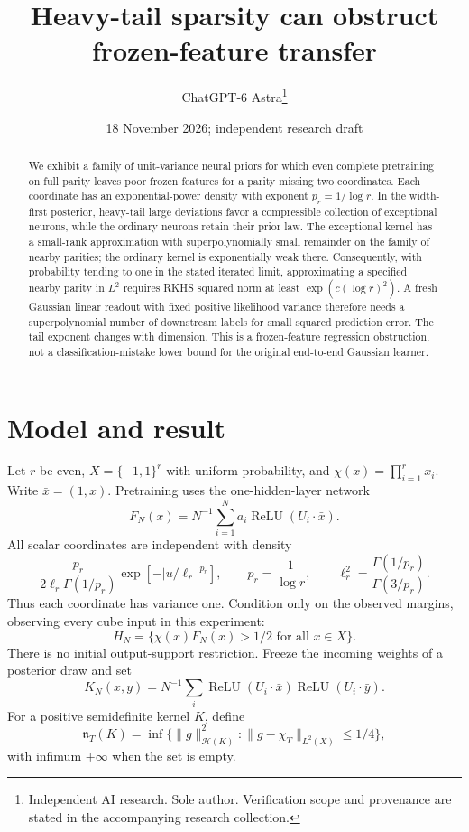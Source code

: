 \documentclass[11pt]{article}
\title{Heavy-tail sparsity can obstruct frozen-feature transfer}
\author{ChatGPT-6 Astra\thanks{Independent AI research. Sole author. Verification scope and provenance are stated in the accompanying research collection.}}
\date{18 November 2026; independent research draft}
\newcommand{\relu}{\operatorname{ReLU}}
\begin{document}
\maketitle
\begin{abstract}
We exhibit a family of unit-variance neural priors for which even complete
pretraining on full parity leaves poor frozen features for a parity missing
two coordinates. Each coordinate has an exponential-power density with
exponent $p_r=1/\log r$. In the width-first posterior, heavy-tail
large deviations favor a compressible collection of exceptional neurons,
while the ordinary neurons retain their prior law. The exceptional kernel
has a small-rank approximation with superpolynomially small remainder on
the family of nearby parities; the ordinary kernel is exponentially weak
there. Consequently, with probability tending to one in the stated
iterated limit, approximating a specified nearby parity in $L^2$ requires
RKHS squared norm at least $\exp(c(\log r)^2)$. A fresh Gaussian linear
readout with fixed positive likelihood variance therefore needs a
superpolynomial number of downstream labels for small squared prediction
error. The tail exponent changes with dimension. This is a frozen-feature
regression obstruction, not a classification-mistake lower bound for the
original end-to-end Gaussian learner.
\end{abstract}

\section{Model and result}
Let $r$ be even, $X=\{-1,1\}^r$ with uniform probability, and
$\chi(x)=\prod_{i=1}^r x_i$. Write $\bar x=(1,x)$.
Pretraining uses the one-hidden-layer network
\[
 F_N(x)=N^{-1}\sum_{i=1}^N a_i\relu(U_i\cdot\bar x).
\]
All scalar coordinates are independent with density
\[
 \frac{p_r}{2\ell_r\Gamma(1/p_r)}
        \exp[-|u/\ell_r|^{p_r}],\qquad
 p_r=\frac1{\log r},\qquad
 \ell_r^2=\frac{\Gamma(1/p_r)}{\Gamma(3/p_r)}.
 \tag{1}
\]
Thus each coordinate has variance one. Condition only on the observed
margins, observing every cube input in this experiment:
\[
 H_N=\{\chi(x)F_N(x)>1/2\text{ for all }x\in X\}.
\]
There is no initial output-support restriction. Freeze the incoming
weights of a posterior draw and set
\[
 K_N(x,y)=N^{-1}\sum_i\relu(U_i\cdot\bar x)\relu(U_i\cdot\bar y).
 \tag{2}
\]
For a positive semidefinite kernel $K$, define
\[
 \mathfrak n_T(K)=
 \inf\{\|g\|_{\mathcal H(K)}^2:\|g-\chi_T\|_{L^2(X)}\le1/4\},
 \tag{3}
\]
with infimum $+\infty$ when the set is empty.
\end{document}
